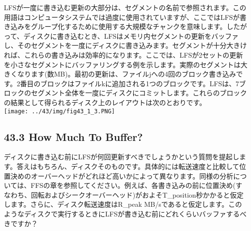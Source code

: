LFSが一度に書き込む更新の大部分は、セグメントの名前で参照されます。この用語はコンピュータシステムでは過度に使用されていますが、ここではLFSが書き込みをグループ化するために使用する大規模なチャンクを意味します。したがって、ディスクに書き込むとき、LFSはメモリ内セグメントの更新をバッファし、そのセグメントを一度にディスクに書き込みます。セグメントが十分大きければ、これらの書き込みは効率的になります。ここでは、LFSが2セットの更新を小さなセグメントにバッファリングする例を示します。実際のセグメントは大きくなります(数MB)。最初の更新は、ファイルjへの4回のブロック書き込みです。2番目のブロックはファイルkに追加される1つのブロックです。LFSは、7ブロックのセグメント全体を一度にディスクにコミットします。これらのブロックの結果として得られるディスク上のレイアウトは次のとおりです。\\
\texttt{[image: ../43/img/fig43\_1\_3.PNG]}

\hypertarget{how-much-to-buffer}{%
\subsection*{43.3 How Much To Buffer?}\label{how-much-to-buffer}}

ディスクに書き込む前にLFSが何回更新すべきでしょうかという質問を提起します。答えはもちろん、ディスクそのものです。具体的には転送速度と比較して位置決めのオーバーヘッドがどれほど高いかによって異なります。同様の分析については、FFSの章を参照してください。例えば、各書き込みの前に位置決め(すなわち、回転およびシークオーバーヘッド)がおよそT\_position秒かかると仮定します。さらに、ディスク転送速度はR\_peak
MB/sであると仮定します。このようなディスクで実行するときにLFSが書き込む前にどれくらいバッファするべきですか？

